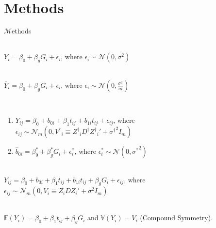 \documentclass[10pt, xcolors={RGB}, hyperref={pdfpagelabels=false,
        colorlinks=true,
        pdftex=true,
        bookmarks=true,
        bookmarksopen=true,
        hyperfootnotes=true}]{beamer}
\newcommand\lettrine[1]{{\huge{$\mathcal{#1}$}}}
\begin{document}
\section{Methods}
\begin{frame}{\lettrine{M}ethods}
\par{
\begin{description}
    \item<1->[Linear Model (Baseline)] \hfill \\\hspace{-5em} $Y_i = \beta_0 + \beta_gG_i + \epsilon_i${\footnotesize{, where $\epsilon_i\sim\mathcal{N}(0, \sigma^2)$}}\\
    \item<2->[Linear Model (Average of $m$ measures)] \hfill \\\hspace{-5em} $\bar{Y}_{i} = \beta_{0} + \beta_gG_i + \epsilon_{i}${\footnotesize{, where $\epsilon_i\sim\mathcal{N}(0, \frac{\sigma^2}{m})$}}\\
    \item<3->[Two-Step] \hfill \\ \vspace{-0.5em}
        \begin{enumerate}\setlength{\itemindent}{-7em}
            \item $Y_{ij} = \beta_{0} + b_{0i} + \beta_{1}t_{ij} + b_{1i}t_{ij} + \epsilon_{ij}${\footnotesize{, where $\epsilon_{ij}\sim{\mathcal{N}}_m(0, V^\dagger{}_i\equiv Z^\dagger{}_iD^\dagger{}Z^\dagger{}_i'+{\sigma^\dagger{}}^2I_m)$}}
            \item $\hat{b}_{0i} = \beta_0^* + \beta_g^*G_i + \epsilon_{i}^*${\footnotesize{, where $\epsilon_{i}^*\sim\mathcal{N}(0, {\sigma^*}^2)$}}
        \end{enumerate}
    \item<4->[Linear Mixed Model (LMM)] \hfill \\\hspace{-5em} $Y_{ij} = \beta_{0} + b_{0i} + \beta_{1}t_{ij} + b_{1i}t_{ij} + \beta_gG_i + \epsilon_{ij}${\footnotesize{, where $\epsilon_{ij}\sim{\mathcal{N}}_m(0, V_i\equiv Z_iDZ_i'+\sigma^2I_m)$}}\\
    \item<5->[Generalised Estimating Equations (GEE)] \hfill \\\hspace{-5em} $\mathbb{E}(Y_i) = \beta_{0} + \beta_{1}t_{ij} + \beta_gG_i$ and $\mathbb{V}(Y_i)=V_i$ (Compound Symmetry).\\
\end{description}
}
\end{frame}
\end{document}
